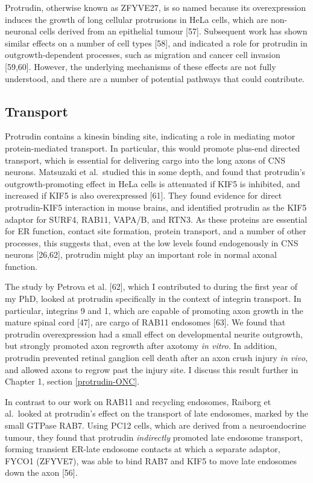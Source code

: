 \documentclass[
  12pt,
  a4paper,
]{book}
\begin{document}
Protrudin, otherwise known as ZFYVE27, is so named because its overexpression induces the growth of long cellular protrusions in HeLa cells, which are non-neuronal cells derived from an epithelial tumour {[}57{]}. Subsequent work has shown similar effects on a number of cell types {[}58{]}, and indicated a role for protrudin in outgrowth-dependent processes, such as migration and cancer cell invasion {[}59,60{]}. However, the underlying mechanisms of these effects are not fully understood, and there are a number of potential pathways that could contribute.

\hypertarget{intro-ptdn-transport}{%
\subsection{Transport}\label{intro-ptdn-transport}}

Protrudin contains a kinesin binding site, indicating a role in mediating motor protein-mediated transport. In particular, this would promote plus-end directed transport, which is essential for delivering cargo into the long axons of CNS neurons. Matsuzaki et al.~studied this in some depth, and found that protrudin's outgrowth-promoting effect in HeLa cells is attenuated if KIF5 is inhibited, and increased if KIF5 is also overexpressed {[}61{]}. They found evidence for direct protrudin-KIF5 interaction in mouse brains, and identified protrudin as the KIF5 adaptor for SURF4, RAB11, VAPA/B, and RTN3. As these proteins are essential for ER function, contact site formation, protein transport, and a number of other processes, this suggests that, even at the low levels found endogenously in CNS neurons {[}26,62{]}, protrudin might play an important role in normal axonal function.

The study by Petrova et al. {[}62{]}, which I contributed to during the first year of my PhD, looked at protrudin specifically in the context of integrin transport. In particular, integrins \textalpha{}9 and \textbeta{}1, which are capable of promoting axon growth in the mature spinal cord {[}47{]}, are cargo of RAB11 endosomes {[}63{]}. We found that protrudin overexpression had a small effect on developmental neurite outgrowth, but strongly promoted axon regrowth after axotomy \emph{in vitro}. In addition, protrudin prevented retinal ganglion cell death after an axon crush injury \emph{in vivo}, and allowed axons to regrow past the injury site. I discuss this result further in Chapter 1, section \ref{protrudin-ONC}.

In contrast to our work on RAB11 and recycling endosomes, Raiborg et al.~looked at protrudin's effect on the transport of late endosomes, marked by the small GTPase RAB7. Using PC12 cells, which are derived from a neuroendocrine tumour, they found that protrudin \emph{indirectly} promoted late endosome transport, forming transient ER-late endosome contacts at which a separate adaptor, FYCO1 (ZFYVE7), was able to bind RAB7 and KIF5 to move late endosomes down the axon {[}56{]}.
\end{document}

